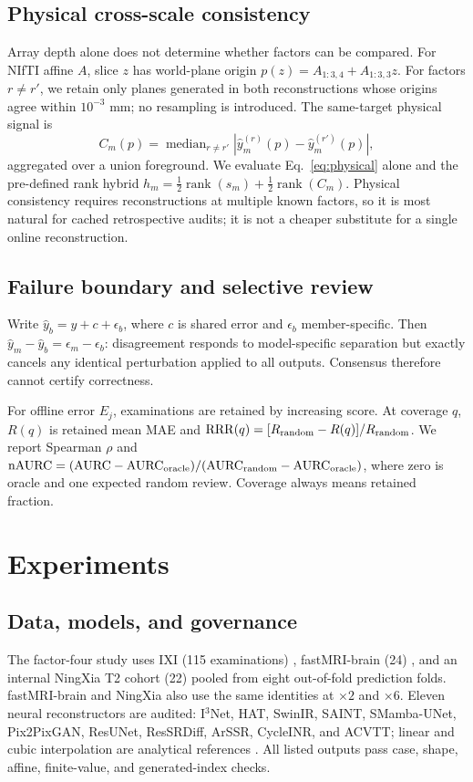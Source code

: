 \documentclass{article}
\begin{document}
\subsection{Physical cross-scale consistency}
Array depth alone does not determine whether factors can be compared. For NIfTI affine $A$, slice $z$ has world-plane origin $p(z)=A_{1:3,4}+A_{1:3,3}z$. For factors $r\neq r'$, we retain only planes generated in both reconstructions whose origins agree within $10^{-3}$ mm; no resampling is introduced. The same-target physical signal is
\begin{equation}
 C_m(p)=\mathop{\mathrm{median}}_{r\neq r'}|\hat y_m^{(r)}(p)-\hat y_m^{(r')}(p)|,
 \label{eq:physical}
\end{equation}
aggregated over a union foreground. We evaluate Eq.~\eqref{eq:physical} alone and the pre-defined rank hybrid $h_m=\tfrac12\operatorname{rank}(s_m)+\tfrac12\operatorname{rank}(C_m)$. Physical consistency requires reconstructions at multiple known factors, so it is most natural for cached retrospective audits; it is not a cheaper substitute for a single online reconstruction.

\subsection{Failure boundary and selective review}
Write $\hat y_b=y+c+\epsilon_b$, where $c$ is shared error and $\epsilon_b$ member-specific. Then $\hat y_m-\hat y_b=\epsilon_m-\epsilon_b$: disagreement responds to model-specific separation but exactly cancels any identical perturbation applied to all outputs. Consensus therefore cannot certify correctness.

For offline error $E_j$, examinations are retained by increasing score. At coverage $q$, $R(q)$ is retained mean MAE and $\mathrm{RRR}(q)=[R_{\rm random}-R(q)]/R_{\rm random}$. We report Spearman $\rho$ and $\mathrm{nAURC}=(\mathrm{AURC}-\mathrm{AURC}_{\rm oracle})/(\mathrm{AURC}_{\rm random}-\mathrm{AURC}_{\rm oracle})$, where zero is oracle and one expected random review. Coverage always means retained fraction.

\section{Experiments}
\subsection{Data, models, and governance}
The factor-four study uses IXI (115 examinations) \cite{ixi}, fastMRI-brain (24) \cite{zbontar2018fastmri}, and an internal NingXia T2 cohort (22) pooled from eight out-of-fold prediction folds. fastMRI-brain and NingXia also use the same identities at $\times2$ and $\times6$. Eleven neural reconstructors are audited: I$^3$Net, HAT, SwinIR, SAINT, SMamba-UNet, Pix2PixGAN, ResUNet, ResSRDiff, ArSSR, CycleINR, and ACVTT; linear and cubic interpolation are analytical references \cite{keys1981cubic,thevenaz2000interpolation}. All listed outputs pass case, shape, affine, finite-value, and generated-index checks.
\end{document}
